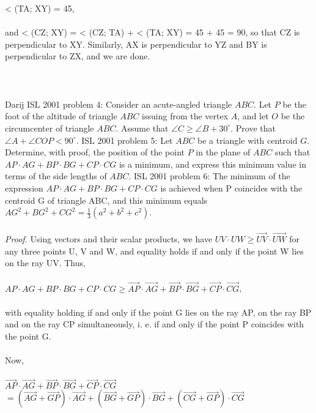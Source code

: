 < (TA; XY) = 45, \\\\
and < (CZ; XY) = < (CZ; TA) + < (TA; XY) = 45 + 45 = 90, so that CZ is perpendicular to XY. Similarly, AX is perpendicular to YZ and BY is perpendicular to ZX, and we are done. \\\\
[By the way, the same approach using spiral dilatations shows that AX = YZ, BY = ZX and CZ = XY.] \\\\
Darij 
ISL 2001 problem 4:  Consider an acute-angled triangle $ABC$. Let $P$ be the foot of the altitude of triangle $ABC$ issuing from the vertex $A$, and let $O$ be the circumcenter of triangle $ABC$. Assume that $\angle C \geq \angle B+30^{\circ}$. Prove that $\angle A+\angle COP < 90^{\circ}$. 
ISL 2001 problem 5:  Let $ABC$ be a triangle with centroid $G$. Determine, with proof, the position of the point $P$ in the plane of $ABC$ such that $AP{\cdot}AG + BP{\cdot}BG + CP{\cdot}CG$ is a minimum, and express this minimum value in terms of the side lengths of $ABC$. 
ISL 2001 problem 6:  The minimum of the expression $AP\cdot AG+BP\cdot BG+CP\cdot CG$ is achieved when P coincides with the centroid G of triangle ABC, and this minimum equals $AG^2+BG^2+CG^2=\frac13 \left( a^2+b^2+c^2\right) $. \\\\
\textit{Proof.} Using vectors and their scalar products, we have $UV\cdot UW\geq \overrightarrow{UV}\cdot \overrightarrow{UW}$ for any three points U, V and W, and equality holds if and only if the point W lies on the ray UV. Thus, \\\\
$AP\cdot AG+BP\cdot BG+CP\cdot CG\geq \overrightarrow{AP}\cdot \overrightarrow{AG}+\overrightarrow{BP}\cdot \overrightarrow{BG}+\overrightarrow{CP}\cdot \overrightarrow{CG}$, \\\\
with equality holding if and only if the point G lies on the ray AP, on the ray BP and on the ray CP simultaneously, i. e. if and only if the point P coincides with the point G. \\\\
Now, \\\\
$\overrightarrow{AP}\cdot \overrightarrow{AG}+\overrightarrow{BP}\cdot \overrightarrow{BG}+\overrightarrow{CP}\cdot \overrightarrow{CG}$ \\
$=\left( \overrightarrow{AG}+\overrightarrow{GP}\right) \cdot \overrightarrow{AG}+\left( \overrightarrow{BG}+\overrightarrow{GP}\right) \cdot \overrightarrow{BG}+\left( \overrightarrow{CG}+\overrightarrow{GP}\right) \cdot \overrightarrow{CG}$ \\
